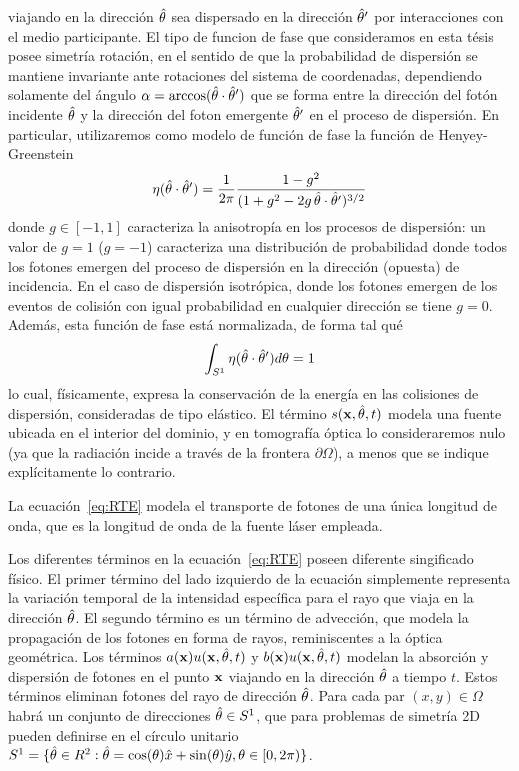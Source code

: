 viajando en la dirección $\hat{\theta}$ sea dispersado en la dirección $\hat{\theta}'$ 
por interacciones con el medio participante. El tipo de funcion 
de fase que consideramos en esta tésis posee simetría rotación, 
en el sentido de que la probabilidad de dispersión se mantiene invariante 
ante rotaciones del sistema de coordenadas, dependiendo solamente 
del ángulo $\alpha=\arccos(\hat{\theta} \cdot \hat{\theta}')$ que se forma entre la dirección 
del fotón incidente $\hat{\theta}$ y la dirección del foton emergente $\hat{\theta}'$ 
en el proceso de dispersión. En particular, utilizaremos como modelo de función de fase la 
función de Henyey-Greenstein~\cite{Henyey1941}
\begin{equation}
\eta(\hat{\theta}\cdot\hat{\theta}')=\frac{1}{2\pi} 
\frac{1-g^2}{(1+g^2-2g \, \hat{\theta} \cdot \hat{\theta}')^{3/2}}
\label{eq:Henyey-Greeinstein}
\end{equation}
donde $g \in [-1,1]$ caracteriza la anisotropía en los procesos de dispersión: 
 un valor de $g=1$ ($g=-1$) caracteriza una distribución de probabilidad donde todos
los fotones emergen del proceso de dispersión en la dirección (opuesta) de 
incidencia. En el caso de dispersión isotrópica, 
donde los fotones emergen de los eventos de colisión con igual probabilidad 
en cualquier dirección se tiene $ g = 0 $. Además, esta función de fase 
está normalizada, de forma tal qué
\begin{equation}
\int_{S^1}\eta(\hat{\theta}\cdot\hat{\theta}') d\theta=1
\label{eq:Henyey-Greeinsteinnorm}
\end{equation}
lo cual, físicamente, expresa la conservación de la energía en las colisiones 
de dispersión, consideradas de tipo elástico. El término $ s(\mathbf{x},\hat{\theta},t)$ 
modela una fuente ubicada en el interior del dominio, y en tomografía óptica 
lo consideraremos nulo (ya que la radiación incide a través de la frontera $\partial \Omega$), 
a menos que se indique explícitamente lo contrario. 

La ecuación~\eqref{eq:RTE} 
modela el transporte de fotones de una única longitud de onda, que es la longitud 
de onda de la fuente láser empleada.

Los diferentes términos en la ecuación~\eqref{eq:RTE} poseen 
diferente singificado físico. El primer término del lado izquierdo de la ecuación simplemente representa la variación temporal  
de la intensidad específica para el rayo que viaja en la dirección $\hat{\theta}$. 
El segundo término es un término de advección, que modela la propagación de 
los fotones en forma de rayos, reminiscentes a la óptica geométrica. Los términos $a(\mathbf{x})u(\mathbf{x},\hat{\theta},t)$ y $b(\mathbf{x})u(\mathbf{x},\hat{\theta},t)$ modelan la 
absorción y dispersión de fotones 
en el punto $\mathbf{x}$ viajando en la dirección $\hat{\theta}$ a tiempo $t$. Estos términos eliminan 
fotones del rayo de dirección $\hat{\theta}$. 
Para cada par $(x,y)\in \Omega$ habrá un conjunto de direcciones $\hat{\theta} \in S^1$, 
que para problemas de simetría 2D 
pueden definirse en el círculo unitario $S^1=\{ \hat{\theta} \in R^2: 
\hat{\theta}=\cos(\theta)\hat x+\sin(\theta) \hat y, \theta \in [0,2\pi)  \}$. 

